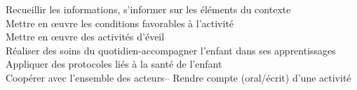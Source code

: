 \documentclass[]{cv-style}          %
\begin{document}
	{Recueillir les informations, s’informer sur les éléments du contexte}\\
	{Mettre en œuvre les conditions favorables à l’activité}\\
	{Mettre en œuvre des activités d’éveil }\\
    {Réaliser des soins du quotidien-accompagner l’enfant dans ses apprentissages}\\
	{Appliquer des protocoles liés à la santé de l’enfant }\\
	{Coopérer avec l’ensemble des acteurs-- Rendre compte (oral/écrit) d’une activité}
\end{document}
